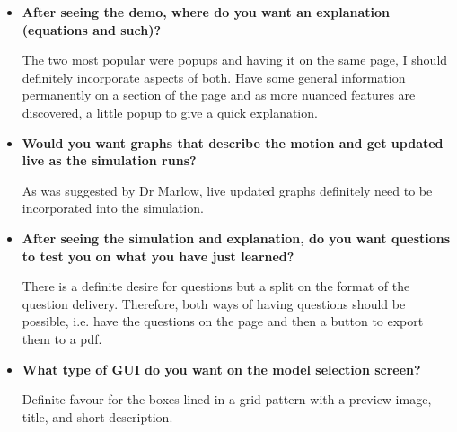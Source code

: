 \documentclass[12pt]{article}
\begin{document}
\begin{itemize}
    \item \textbf{After seeing the demo, where do you want an explanation (equations and such)?}
\begin{center}
\end{center}
The two most popular were popups and having it on the same page, I should definitely incorporate aspects of both. Have some general information permanently on a section of the page and as more nuanced features are discovered, a little popup to give a quick explanation.
\end{itemize}

\newpage
\begin{itemize}
    \item \textbf{Would you want graphs that describe the motion and get updated live as the simulation runs?}
\begin{center}
\end{center}
As was suggested by Dr Marlow, live updated graphs definitely need to be incorporated into the simulation.
\end{itemize}

\begin{itemize}
    \item \textbf{After seeing the simulation and explanation, do you want questions to test you on what you have just learned?}
\begin{center}
\end{center}
There is a definite desire for questions but a split on the format of the question delivery. Therefore, both ways of having questions should be possible, i.e. have the questions on the page and then a button to export them to a pdf.
\end{itemize}

\newpage
\begin{itemize}
    \item \textbf{What type of GUI do you want on the model selection screen?}
\begin{center}
\end{center}
Definite favour for the boxes lined in a grid pattern with a preview image, title, and short description.
\end{itemize}
\end{document}
